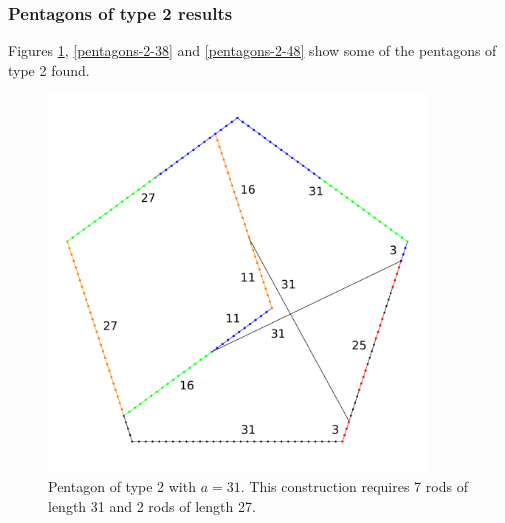 \documentclass[11pt]{article}
\begin{document}
\subsubsection{Pentagons of type 2 results}

Figures \ref{pentagons-2-31}, \ref{pentagons-2-38} and \ref{pentagons-2-48} show some of the pentagons of type 2 found.

\begin{figure}
\centering
\includegraphics[width=10cm]{figs/pentagons-2-31}
\caption{Pentagon of type 2 with $a=31$. This construction requires 7 rods of 
length 31 and 2 rods of length 27.}
\label{pentagons-2-31}
\end{figure}
\end{document}
